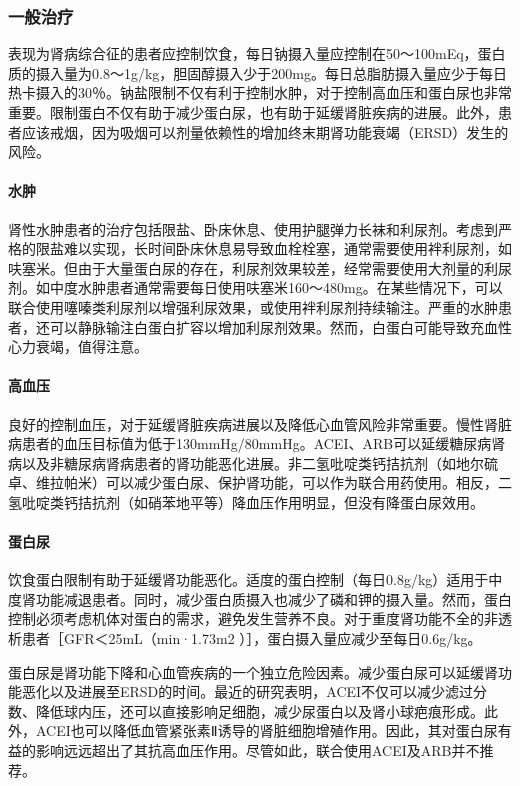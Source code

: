 \subsubsection{一般治疗}

表现为肾病综合征的患者应控制饮食，每日钠摄入量应控制在50～100mEq，蛋白质的摄入量为0.8～1g/kg，胆固醇摄入少于200mg。每日总脂肪摄入量应少于每日热卡摄入的30％。钠盐限制不仅有利于控制水肿，对于控制高血压和蛋白尿也非常重要。限制蛋白不仅有助于减少蛋白尿，也有助于延缓肾脏疾病的进展。此外，患者应该戒烟，因为吸烟可以剂量依赖性的增加终末期肾功能衰竭（ERSD）发生的风险。
\paragraph{水肿}

肾性水肿患者的治疗包括限盐、卧床休息、使用护腿弹力长袜和利尿剂。考虑到严格的限盐难以实现，长时间卧床休息易导致血栓栓塞，通常需要使用袢利尿剂，如呋塞米。但由于大量蛋白尿的存在，利尿剂效果较差，经常需要使用大剂量的利尿剂。如中度水肿患者通常需要每日使用呋塞米160～480mg。在某些情况下，可以联合使用噻嗪类利尿剂以增强利尿效果，或使用袢利尿剂持续输注。严重的水肿患者，还可以静脉输注白蛋白扩容以增加利尿剂效果。然而，白蛋白可能导致充血性心力衰竭，值得注意。
\paragraph{高血压}

良好的控制血压，对于延缓肾脏疾病进展以及降低心血管风险非常重要。慢性肾脏病患者的血压目标值为低于130mmHg/80mmHg。ACEI、ARB可以延缓糖尿病肾病以及非糖尿病肾病患者的肾功能恶化进展。非二氢吡啶类钙拮抗剂（如地尔硫卓、维拉帕米）可以减少蛋白尿、保护肾功能，可以作为联合用药使用。相反，二氢吡啶类钙拮抗剂（如硝苯地平等）降血压作用明显，但没有降蛋白尿效用。
\paragraph{蛋白尿}

饮食蛋白限制有助于延缓肾功能恶化。适度的蛋白控制（每日0.8g/kg）适用于中度肾功能减退患者。同时，减少蛋白质摄入也减少了磷和钾的摄入量。然而，蛋白控制必须考虑机体对蛋白的需求，避免发生营养不良。对于重度肾功能不全的非透析患者［GFR＜25mL（min·1.73m{2}
）］，蛋白摄入量应减少至每日0.6g/kg。

蛋白尿是肾功能下降和心血管疾病的一个独立危险因素。减少蛋白尿可以延缓肾功能恶化以及进展至ERSD的时间。最近的研究表明，ACEI不仅可以减少滤过分数、降低球内压，还可以直接影响足细胞，减少尿蛋白以及肾小球疤痕形成。此外，ACEI也可以降低血管紧张素Ⅱ诱导的肾脏细胞增殖作用。因此，其对蛋白尿有益的影响远远超出了其抗高血压作用。尽管如此，联合使用ACEI及ARB并不推荐。

